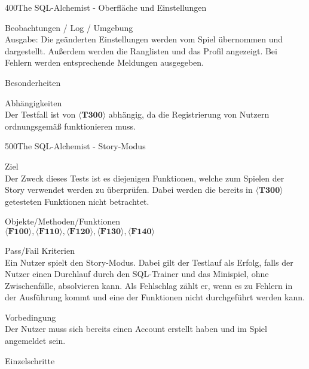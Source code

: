 \begin{testcase}{400}{The SQL-Alchemist - Oberfläche und Einstellungen}
\item[Beobachtungen / Log / Umgebung]~\\
Ausgabe:
Die geänderten Einstellungen werden vom Spiel übernommen und dargestellt. Außerdem werden die Ranglisten und das Profil angezeigt. Bei Fehlern werden entsprechende Meldungen ausgegeben.
\item[Besonderheiten]~\\

\item[Abhängigkeiten]~\\
Der Testfall ist von $\langle\textbf{T300}\rangle$ abhängig, da die Registrierung von Nutzern ordnungsgemäß funktionieren muss.

\end{testcase}

\begin{testcase}{500}{The SQL-Alchemist - Story-Modus}

\item[Ziel]~\\
Der Zweck dieses Tests ist es diejenigen Funktionen, welche zum Spielen der Story verwendet werden zu überprüfen. Dabei werden die bereits in $\langle\textbf{T300}\rangle$ getesteten Funktionen nicht betrachtet.

\item[Objekte/Methoden/Funktionen]~\\
$\langle\textbf{F100}\rangle, \langle\textbf{F110}\rangle, \langle\textbf{F120}\rangle, \langle\textbf{F130}\rangle, \langle\textbf{F140}\rangle$ 

\item[Pass/Fail Kriterien]~\\
Ein Nutzer spielt den Story-Modus. Dabei gilt der Testlauf als Erfolg, falls der Nutzer einen Durchlauf durch den SQL-Trainer und das Minispiel, ohne Zwischenfälle, absolvieren kann. Als Fehlschlag zählt er, wenn es zu Fehlern in der Ausführung kommt und eine der Funktionen nicht durchgeführt werden kann. 

\item[Vorbedingung]~\\
Der Nutzer muss sich bereits einen Account erstellt haben und im Spiel angemeldet sein.

\item[Einzelschritte]~\\


\end{testcase}
